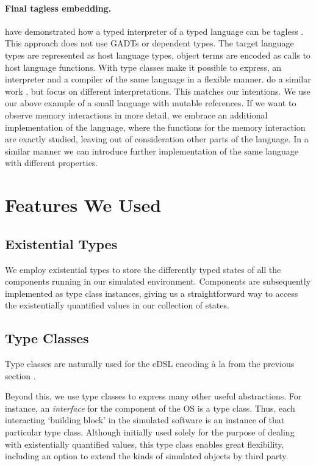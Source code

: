 \paragraph{Final tagless embedding.}
\citeauthor{final_tagless_embedding} have demonstrated how a typed interpreter of a typed language can be tagless \cite{final_tagless_embedding}.
This approach does not use GADTs or dependent types.
The target language types are represented as host language types, object terms are encoded as calls to host language functions. With type classes \citeauthor{final_tagless_embedding} make it possible to express, \eg an interpreter and a compiler of the same language in a flexible manner.
\citeauthor{Hofer:2008:PED:1449913.1449935} do a similar work \cite{Hofer:2008:PED:1449913.1449935}, but focus on different interpretations.
This matches our intentions.
We use our above example of a small language with mutable references.
If we want to observe memory interactions in more detail, we embrace
an additional implementation of the language, where the functions for
the memory interaction are exactly studied, leaving out of consideration other parts of the language.
In a similar manner we can introduce further implementation of the same language with different properties.

\section{Features We Used}
\label{sec:impl-detail}

\subsection{Existential Types}
We employ existential types to store the differently typed states of all the components running in our simulated environment.
Components are subsequently implemented as type class instances, giving us a straightforward way to access the existentially quantified values in our collection of states.

\subsection{Type Classes}
Type classes \cite{Hall:1996:TCH:227699.227700} are naturally used for
the eDSL encoding \`a la \citeauthor{final_tagless_embedding} from the
previous section \cite{final_tagless_embedding}.

Beyond this, we use type classes to express many other useful abstractions.
For instance, an \emph{interface} for the component of the OS is a type class.
Thus, each interacting `building block' in the simulated software is an instance of that particular type class.
Although initially used solely for the purpose of dealing with existentially quantified values, this  type class enables great flexibility, including an option to extend the kinds of simulated objects by third party.

